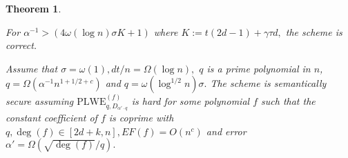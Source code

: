 \documentclass[11pt]{article}
\newtheorem{theorem}{Theorem}[section]
\begin{document}
\begin{theorem}
\label{thm:dualregev}

For $\alpha^{-1} > (4 \omega(\log n) \sigma K+1)  $ where $K:= t(2d-1) + \gamma \tau d,$ the scheme is correct. 

Assume that $\sigma = \omega(1), dt/n= \Omega(\log n),$ $q$ is a prime polynomial in $n$, $q =\Omega (\alpha^{-1}n^{1+1/2+c})$ and $q = \omega(\log^{1/2} n) \sigma. $ The scheme is semantically secure assuming $\text{PLWE}^{(f)}_{q, D_{\alpha'\cdot q} }$ is hard for some polynomial $f$ such that the constant coefficient of $f$ is coprime with $q, \deg (f) \in [2d+k, n], EF(f) =O(n^c)$ and error $\alpha' = \Omega(\sqrt{\deg(f) }/q).$ 
\end{theorem}
\end{document}
